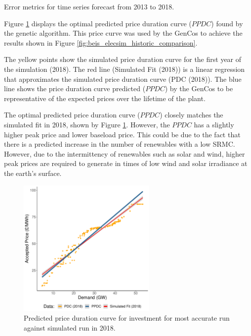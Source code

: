\begin{table}[htb]
	\centering
	\caption{Error metrics for time series forecast from 2013 to 2018.}
	\label{table:metrics}
\end{table}

Figure \ref{fig:best_price_curve} displays the optimal predicted price duration curve ($PPDC$) found by the genetic algorithm. This price curve was used by the GenCos to achieve the results shown in Figure \ref{fig:beis_elecsim_historic_comparison}. 

The yellow points show the simulated price duration curve for the first year of the simulation (2018). The red line (Simulated Fit (2018)) is a linear regression that approximates the simulated price duration curve (PDC (2018)). The blue line shows the price duration curve predicted ($PPDC$) by the GenCos to be representative of the expected prices over the lifetime of the plant.


The optimal predicted price duration curve ($PPDC$) closely matches the simulated fit in 2018, shown by Figure \ref{fig:best_price_curve}. However, the $PPDC$ has a slightly higher peak price and lower baseload price. This could be due to the fact that there is a predicted increase in the number of renewables with a low SRMC. However, due to the intermittency of renewables such as solar and wind, higher peak prices are required to generate in times of low wind and solar irradiance at the earth's surface.



\begin{figure}
	\centering
	\includegraphics[width=0.6\textwidth]{Chapter4/figures/e-Energy-2020/results/best_run_price_dur_curve.pdf}
	\caption{Predicted price duration curve for investment for most accurate run against simulated run in 2018.}
	\label{fig:best_price_curve}
\end{figure}



